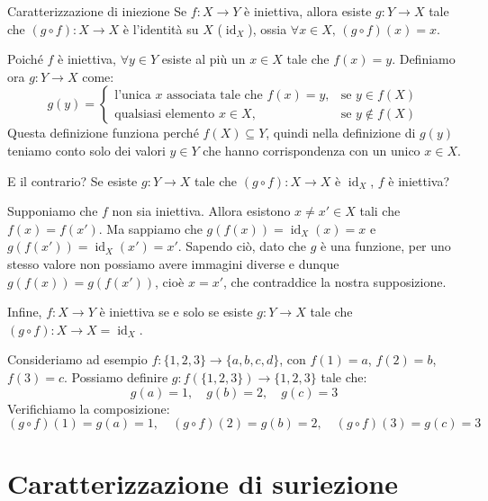\documentclass[12pt]{report}
\begin{document}
	\begin{teorema}{Caratterizzazione di iniezione}{}
		Se $f: X \to Y$ è iniettiva, allora esiste $g: Y \to X$ tale che $(g \circ f): X \to X$ è l'identità su $X$ ($\operatorname{id}_X$), ossia $\forall x \in X, \, (g \circ f)(x) = x$.
	\end{teorema}
	
	\begin{dimostrazione}{}{}
		Poiché $f$ è iniettiva, $\forall y \in Y$ esiste al più un $x \in X$ tale che $f(x) = y$.
		Definiamo ora $g: Y \to X$ come:
		\[
		g(y) =
		\begin{cases}
			\text{l'unica } x \text{ associata tale che } f(x) = y, & \text{se } y \in f(X) \\
			\text{qualsiasi elemento } x \in X, & \text{se } y \notin f(X)
		\end{cases}
		\]
		Questa definizione funziona perché $f(X) \subseteq Y$, quindi nella definizione di $g(y)$ teniamo conto solo dei valori $y \in Y$ che hanno corrispondenza con un unico $x \in X$.
	\end{dimostrazione}
	
	E il contrario? Se esiste $g: Y \to X$ tale che $(g \circ f): X \to X$ è $\operatorname{id}_X$, $f$ è iniettiva?
	
	\begin{dimostrazione}{}{}
		Supponiamo che $f$ non sia iniettiva. Allora esistono $x \neq x' \in X$ tali che $f(x) = f(x')$.
		Ma sappiamo che $g(f(x)) = \operatorname{id}_X(x) = x$ e $g(f(x')) = \operatorname{id}_X(x') = x'$. Sapendo ciò, dato che $g$ è una funzione, per uno stesso valore non possiamo avere immagini diverse e dunque $g(f(x)) = g(f(x'))$, cioè $x = x'$, che contraddice la nostra supposizione.
	\end{dimostrazione}
	
	Infine, $f: X \to Y$ è iniettiva se e solo se esiste $g: Y \to X$ tale che $(g \circ f): X \to X = \operatorname{id}_X$.
	
	\begin{osservazione}{}{}
		Consideriamo ad esempio $f: \{1, 2, 3\} \to \{a, b, c, d\}$, con $f(1) = a$, $f(2) = b$, $f(3) = c$.
		Possiamo definire $g: f(\{1, 2, 3\}) \to \{1, 2, 3\}$ tale che:
		\[
		g(a) = 1, \quad g(b) = 2, \quad g(c) = 3
		\]
		Verifichiamo la composizione:
		\[
		(g \circ f)(1) = g(a) = 1, \quad (g \circ f)(2) = g(b) = 2, \quad (g \circ f)(3) = g(c) = 3
		\]
	\end{osservazione}
	
	\section{Caratterizzazione di suriezione}
	
\end{document}
